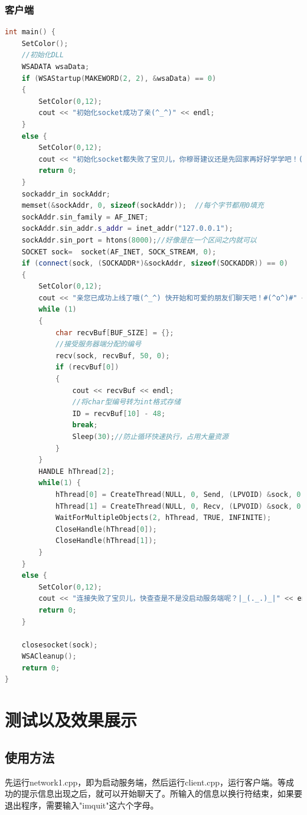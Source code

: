 \documentclass[UTF8,a4paper,10pt]{ctexart}
\begin{document}
\subsubsection{客户端}
\begin{lstlisting}[frame=trbl,language={C++}]
int main() {
    SetColor();
    //初始化DLL
    WSADATA wsaData;
    if (WSAStartup(MAKEWORD(2, 2), &wsaData) == 0)
    {
        SetColor(0,12);
        cout << "初始化socket成功了亲(^_^)" << endl;
    }
    else {
        SetColor(0,12);
        cout << "初始化socket都失败了宝贝儿，你穆哥建议还是先回家再好好学学吧！(￢_￢)" << endl;
        return 0;
    }
    sockaddr_in sockAddr;
    memset(&sockAddr, 0, sizeof(sockAddr));  //每个字节都用0填充
    sockAddr.sin_family = AF_INET;
    sockAddr.sin_addr.s_addr = inet_addr("127.0.0.1");
    sockAddr.sin_port = htons(8000);//好像是在一个区间之内就可以
    SOCKET sock=  socket(AF_INET, SOCK_STREAM, 0);
    if (connect(sock, (SOCKADDR*)&sockAddr, sizeof(SOCKADDR)) == 0)
    {
        SetColor(0,12);
        cout << "亲您已成功上线了哦(^_^) 快开始和可爱的朋友们聊天吧！#(^o^)#" << endl;;
        while (1)
        {
            char recvBuf[BUF_SIZE] = {};
            //接受服务器端分配的编号
            recv(sock, recvBuf, 50, 0);
            if (recvBuf[0])
            {
                cout << recvBuf << endl;
                //将char型编号转为int格式存储
                ID = recvBuf[10] - 48;
                break;
                Sleep(30);//防止循环快速执行，占用大量资源
            }
        }
        HANDLE hThread[2];
        while(1) {
            hThread[0] = CreateThread(NULL, 0, Send, (LPVOID) &sock, 0, NULL);
            hThread[1] = CreateThread(NULL, 0, Recv, (LPVOID) &sock, 0, NULL);
            WaitForMultipleObjects(2, hThread, TRUE, INFINITE);
            CloseHandle(hThread[0]);
            CloseHandle(hThread[1]);
        }
    }
    else {
        SetColor(0,12);
        cout << "连接失败了宝贝儿，快查查是不是没启动服务端呢？|_(._.)_|" << endl;
        return 0;
    }
    
    closesocket(sock);
    WSACleanup();
    return 0;
}
\end{lstlisting}

\section{测试以及效果展示}
\subsection{使用方法}
先运行network1.cpp，即为启动服务端，然后运行client.cpp，运行客户端。等成功的提示信息出现之后，就可以开始聊天了。所输入的信息以换行符结束，如果要退出程序，需要输入"imquit"这六个字母。
\end{document}

